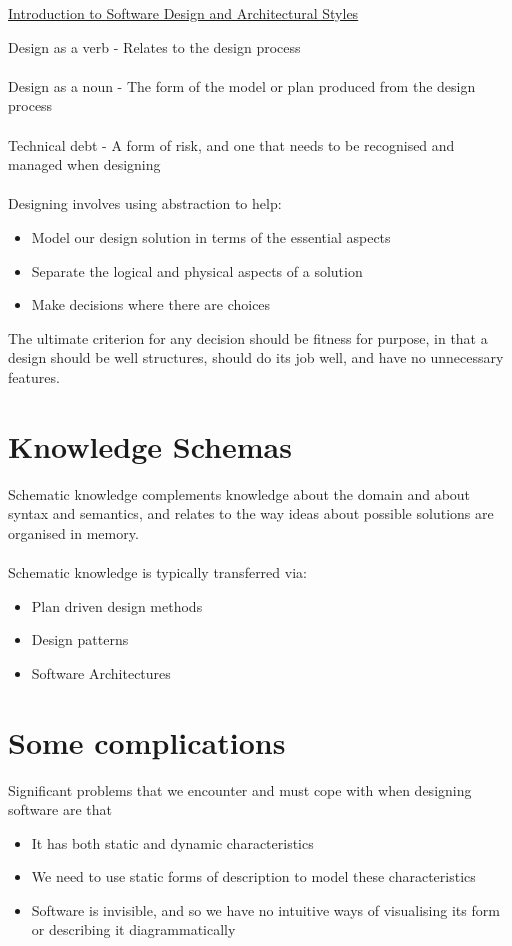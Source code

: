 \documentclass{article}[18pt]
\begin{document}
\begin{center}
\underline{\huge Introduction to Software Design and Architectural Styles}
\end{center}
Design as a verb - Relates to the design process\\
\\
Design as a noun - The form of the model or plan produced from the design process\\
\\
Technical debt - A form of risk, and one that needs to be recognised and managed when designing\\
\\
Designing involves using abstraction to help:
\begin{itemize}
	\item Model our design solution in terms of the essential aspects
	\item Separate the logical and physical aspects of a solution
	\item Make decisions where there are choices
\end{itemize}
The ultimate criterion for any decision should be fitness for purpose, in that a design should be well structures, should do its job well, and have no unnecessary features.
\section{Knowledge Schemas}
Schematic knowledge complements knowledge about the domain and about syntax and semantics, and relates to the way ideas about possible solutions are organised in memory.\\
\\
Schematic knowledge is typically transferred via:
\begin{itemize}
	\item Plan driven design methods
	\item Design patterns
	\item Software Architectures
\end{itemize}
\section{Some complications}
Significant problems that we encounter and must cope with when designing software are that
\begin{itemize}
	\item It has both static and dynamic characteristics
	\item We need to use static forms of description to model these characteristics
	\item Software is invisible, and so we have no intuitive ways of visualising its form or describing it diagrammatically 
\end{itemize}
\end{document}
